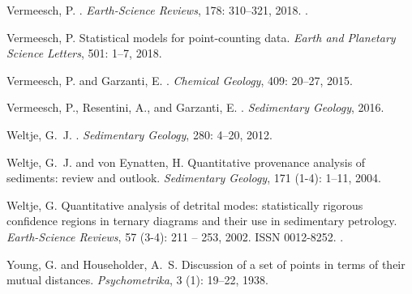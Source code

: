 \documentclass[11pt]{article}
\begin{document}
\begin{thebibliography}{68}
Vermeesch, P.
.
\newblock \emph{Earth-Science Reviews}, 178: 310--321,
  2018{}.
\newblock {}.

Vermeesch, P.
\newblock Statistical models for point-counting data.
\newblock \emph{Earth and Planetary Science Letters}, 501: 1--7,
  2018{}.

Vermeesch, P. and Garzanti, E.
.
\newblock \emph{Chemical Geology}, 409: 20--27, 2015.

Vermeesch, P., Resentini, A., and Garzanti, E.
.
\newblock \emph{Sedimentary Geology}, 2016.

Weltje, G.~J.
.
\newblock \emph{Sedimentary Geology}, 280: 4--20, 2012.

Weltje, G.~J. and von Eynatten, H.
\newblock Quantitative provenance analysis of sediments: review and outlook.
\newblock \emph{Sedimentary Geology}, 171 (1-4): 1--11, 2004.

Weltje, G.
\newblock Quantitative analysis of detrital modes: statistically rigorous
  confidence regions in ternary diagrams and their use in sedimentary
  petrology.
\newblock \emph{Earth-Science Reviews}, 57 (3-4): 211 -- 253,
  2002.
\newblock ISSN 0012-8252.
\newblock {}.

Young, G. and Householder, A.~S.
\newblock Discussion of a set of points in terms of their mutual distances.
\newblock \emph{Psychometrika}, 3 (1): 19--22, 1938.

\end{thebibliography}
\end{document}
